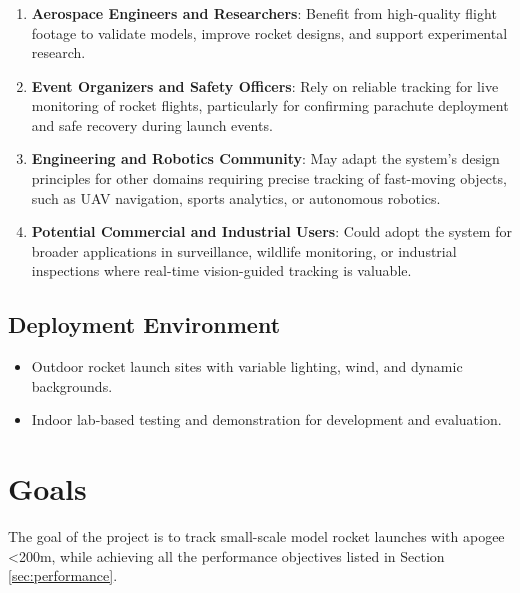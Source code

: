 \documentclass{article}
\begin{document}
\subsubsection*{\color{blue}{Indirect Stakeholders}}
\begin{enumerate}
  \item \textbf{Aerospace Engineers and Researchers}: Benefit from
        high-quality flight footage to validate models, improve rocket
        designs, and support experimental research.

  \item \textbf{Event Organizers and Safety Officers}: Rely on
        reliable tracking for live monitoring of rocket flights,
        particularly for confirming parachute deployment and safe
        recovery during launch events.

  \item \textbf{Engineering and Robotics Community}: May adapt the
        system’s design principles for other domains requiring precise
        tracking of fast-moving objects, such as UAV navigation, sports
        analytics, or autonomous robotics.

  \item \textbf{Potential Commercial and Industrial Users}: Could
        adopt the system for broader applications in surveillance,
        wildlife monitoring, or industrial inspections where real-time
        vision-guided tracking is valuable.
\end{enumerate}

\subsection{Deployment Environment}

\begin{itemize}
  \item Outdoor rocket launch sites with variable lighting, wind, and dynamic
        backgrounds.
  \item Indoor lab-based testing and demonstration for development and evaluation.
\end{itemize}

\section{Goals}

The goal of the project is to track small-scale model rocket launches with
apogee \textless 200m, while achieving all the performance objectives listed in
Section \ref{sec:performance}.
\end{document}
